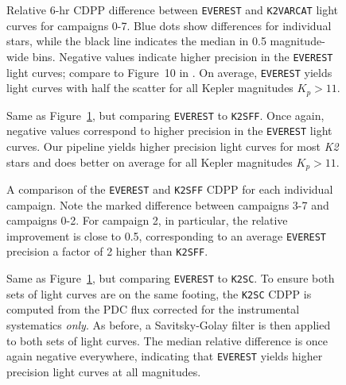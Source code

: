 \documentclass[]{emulateapj}
\begin{document}
\begin{figure}[h]
  \begin{center}
       \caption{Relative 6-hr CDPP difference between \texttt{EVEREST}
                and \texttt{K2VARCAT} light curves for campaigns 0-7. Blue dots
                show differences for individual stars, while the black line
                indicates the median in 0.5 magnitude-wide bins. Negative
                values indicate higher precision in the \texttt{EVEREST}
                light curves; compare to Figure~10 in \cite{AIG16}. On average, \texttt{EVEREST} yields
                light curves with half the scatter for all Kepler magnitudes $K_p > 11$.}
     \label{fig:comparison_k2varcat}
  \end{center}
\end{figure}
\begin{figure}[h]
  \begin{center}
       \caption{Same as Figure~\ref{fig:comparison_k2varcat}, but comparing 
                \texttt{EVEREST} to \texttt{K2SFF}. Once again, negative values
                correspond to higher precision in the \texttt{EVEREST} light curves.
                Our pipeline yields higher
                precision light curves for most \emph{K2} stars and does
                better on average for all Kepler magnitudes $K_p > 11$.}
     \label{fig:comparison_k2sff}
  \end{center}
\end{figure}
\begin{figure*}[t]
  \begin{center}
      \leavevmode
       \caption{A comparison of the \texttt{EVEREST} and \texttt{K2SFF} CDPP for
                each individual campaign. Note the marked difference between
                campaigns 3-7 and campaigns 0-2. For campaign 2, in particular,
                the relative improvement is close to 0.5, corresponding to an average
                \texttt{EVEREST} precision a factor of 2 higher than \texttt{K2SFF}.}
     \label{fig:comparison_k2sff_by_campaign}
  \end{center}
\end{figure*}
\begin{figure}[h]
  \begin{center}
       \caption{Same as Figure~\ref{fig:comparison_k2varcat}, but comparing 
                \texttt{EVEREST} to \texttt{K2SC}. To ensure both sets of light curves
                are on the same footing, the \texttt{K2SC} CDPP
                is computed from the PDC flux corrected for the instrumental 
                systematics \emph{only}. As before, a Savitsky-Golay filter
                is then applied to both sets of light curves. The median relative difference
                is once again negative everywhere, indicating that \texttt{EVEREST} yields higher
                precision light curves at all magnitudes.}
     \label{fig:comparison_k2sc}
  \end{center}
\end{figure}
\end{document}
